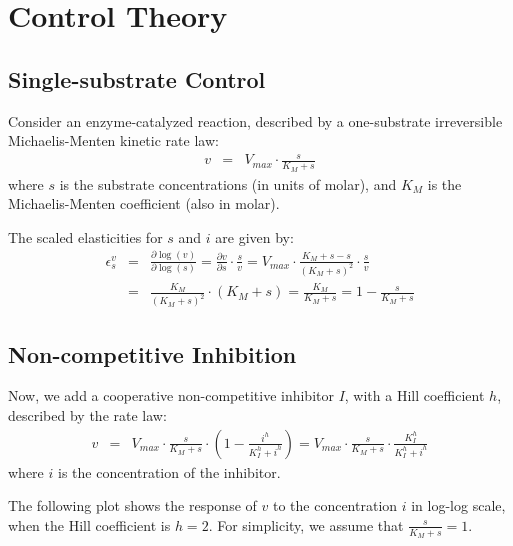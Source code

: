 \documentclass[12pt,a4paper]{article}
\begin{document}
\section{Control Theory}
\subsection{Single-substrate Control}
Consider an enzyme-catalyzed reaction, described by a one-substrate irreversible Michaelis-Menten kinetic rate law:
\begin{eqnarray}
    v &=& V_{max} \cdot \frac{s}{K_M + s}
\end{eqnarray}
where $s$ is the substrate concentrations (in units of molar), and $K_M$ is the Michaelis-Menten coefficient (also in molar).

The scaled elasticities for $s$ and $i$ are given by:
\begin{eqnarray}
    \epsilon_s^v &=& \frac{\partial \log(v)}{\partial \log(s)} = \frac{\partial v}{\partial s}\cdot\frac{s}{v} = V_{max} \cdot \frac{K_M + s - s}{(K_M + s)^2} \cdot \frac{s}{v} \nonumber \\
    &=& \frac{K_M}{(K_M + s)^2} \cdot (K_M + s) = \frac{K_M}{K_M + s} = 1 - \frac{s}{K_M + s}
\end{eqnarray}

\subsection{Non-competitive Inhibition}
Now, we add a cooperative non-competitive inhibitor $I$, with a Hill coefficient $h$, described by the rate law:
\begin{eqnarray}
    v &=& V_{max} \cdot \frac{s}{K_M + s} \cdot \left(1 - \frac{i^h}{K_I^h + i^h}\right) =
    V_{max} \cdot \frac{s}{K_M + s} \cdot \frac{K_I^h}{K_I^h + i^h}
\end{eqnarray}
where $i$ is the concentration of the inhibitor.

The following plot shows the response of $v$ to the concentration $i$ in log-log scale, when the Hill coefficient is $h = 2$. For simplicity, we assume that $\frac{s}{K_M + s} = 1$.

\end{document}
